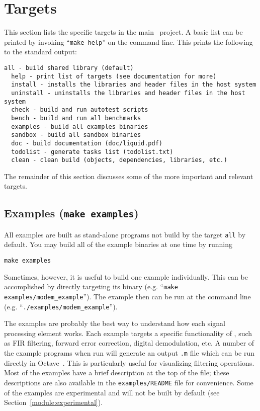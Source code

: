 \section{Targets}
\label{section:installation:targets}
This section lists the specific targets in the main \liquid\ project.
A basic list can be printed by invoking ``{\tt make help}'' on the
command line.
This prints the following to the standard output:
%
\begin{Verbatim}[fontsize=\small]
  all - build shared library (default)
  help - print list of targets (see documentation for more)
  install - installs the libraries and header files in the host system
  uninstall - uninstalls the libraries and header files in the host system
  check - build and run autotest scripts
  bench - build and run all benchmarks
  examples - build all examples binaries
  sandbox - build all sandbox binaries
  doc - build documentation (doc/liquid.pdf)
  todolist - generate tasks list (todolist.txt)
  clean - clean build (objects, dependencies, libraries, etc.)
\end{Verbatim}
%
The remainder of this section discusses some of the more important and
relevant targets.


\subsection{Examples ({\tt make examples})}
\label{section:installation:targets:examples}
All examples are built as stand-alone programs not build by the target
{\tt all} by default.
You may build all of the example binaries at one time by running
%
\begin{Verbatim}[fontsize=\small]
    make examples
\end{Verbatim}
%
Sometimes, however, it is useful to build one example individually.
This can be accomplished by directly targeting its binary
(e.g. ``{\tt make examples/modem\_example}'').
The example then can be run at the command line
(e.g. ``{\tt ./examples/modem\_example}'').

The examples are probably the best way to understand how each signal
processing element works.
Each example targets a specific functionality of \liquid,
such as FIR filtering, forward error correction, digital demodulation,
etc.
A number of the example programs when run will generate an output
{\tt .m} file which can be run directly in Octave~\cite{octave:web}.
This is particularly useful for visualizing filtering operations.
Most of the examples have a brief description at the top of the file;
these descriptions are also available in the {\tt examples/README} file
for convenience.
Some of the examples are experimental and will not be built by default
(see Section~\ref{module:experimental}).

